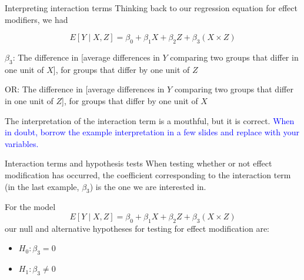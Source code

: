 \documentclass[10pt,t]{beamer}
\begin{document}
\begin{frame}{Interpreting interaction terms}
Thinking back to our regression equation for effect modifiers, we had

$$
E[Y \mid X, Z] = \beta_0 + \beta_1 X + \beta_2 Z + \beta_3 (X \times Z)
$$

$\beta_3$: The difference in [average differences in $Y$ comparing two groups that differ in one unit of $X$], for groups that differ by one unit of $Z$ 

\vspace{0.3cm}

OR: The difference in [average differences in $Y$ comparing two groups that differ in one unit of $Z$], for groups that differ by one unit of $X$

\vspace{0.3cm}
\pause
The interpretation of the interaction term is a mouthful, but it is correct. \textcolor{blue}{When in doubt, borrow the example interpretation in a few slides and replace with your variables.}

\vspace{0.3cm}

\end{frame}

\begin{frame}{Interaction terms and hypothesis tests}
When testing whether or not effect modification has occurred, the coefficient corresponding to the interaction term (in the last example, $\beta_3$) is the one we are interested in. 

\vspace{0.3cm}

For the model
$$
E[Y \mid X, Z] = \beta_0 + \beta_1 X + \beta_2 Z + \beta_3 (X \times Z)
$$
our null and alternative hypotheses for testing for effect modification are:

\vspace{0.3cm}

\begin{itemize}
	\item $H_0: \beta_3 = 0$
	\item $H_1: \beta_3 \neq 0$
\end{itemize}

\end{frame}
\end{document}
